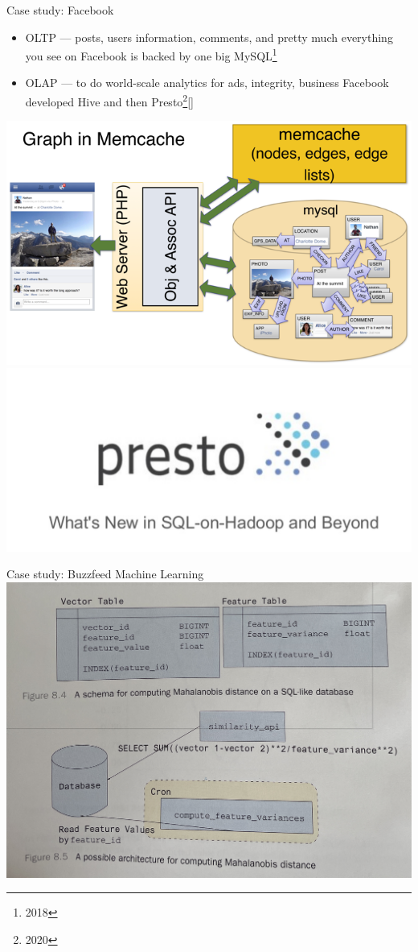 \documentclass[t,pdf]{beamer}
\begin{document}
\begin{frame}{Case study: Facebook}
\begin{itemize}
    \item OLTP — posts, users information, comments, and pretty much everything you see on Facebook is backed by one big MySQL\footnote{2018}
    \item OLAP — to do world-scale analytics for ads, integrity, business Facebook developed Hive and then Presto\footnote{2020}[]
\end{itemize}

\includegraphics[height=.3\textheight]{example-fb-tao}
\includegraphics[height=.3\textheight]{example-fb-presto}

\end{frame}

\begin{frame}{Case study: Buzzfeed Machine Learning}
\includegraphics[height=.7\textheight]{buzzfeed_ml}
\end{frame}
\end{document}

